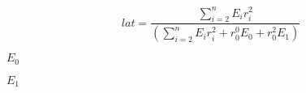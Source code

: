 \documentclass{article}
\begin{document}
\[ lat = \frac{\sum_{i=2}^{n} E_i r_i^2 }{ (\sum_{i=2}^{n} E_i r_i^2 + r_0^0 E_0 + r_0^2 E_1) } \]
\pagebreak

$ E_{0} $
\pagebreak

$ E_{1} $
\pagebreak
\end{document}
